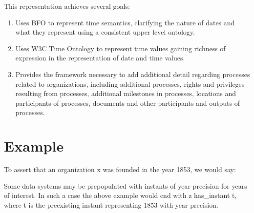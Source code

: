 \documentclass[letterpaper,10pt,english]{sphinxmanual}
\begin{document}
\sphinxAtStartPar
This representation achieves several goals:
\begin{enumerate}
%
\item {} 
\sphinxAtStartPar
Uses BFO to represent time semantics, clarifying the nature of dates and what
they represent using a consistent upper level ontology.

\item {} 
\sphinxAtStartPar
Uses W3C Time Ontology to represent time values gaining richness of expression
in the representation of date and time values.

\item {} 
\sphinxAtStartPar
Provides the framework necessary to add additional detail regarding processes
related to organizations, including additional processes, rights and privileges
resulting from processes, additional milestones in processes,
locations and participants of processes, documents and other participants and
outputs of processes.

\end{enumerate}


\section{Example}
\label{\detokenize{datetimes:example}}
\sphinxAtStartPar
To assert that an organization x was founded in the year 1853, we would say:

\begin{sphinxVerbatim}[commandchars=\\\{\}]
  
  
  
  
  
  
  
  
  
\end{sphinxVerbatim}

\sphinxAtStartPar
{}  Some data systems may be pre\sphinxhyphen{}populated with instants
of year precision for years of interest.  In such a case the above example would
end with z has\_instant t, where t is the pre\sphinxhyphen{}existing instant representing 1853 with
year precision.
\end{document}
